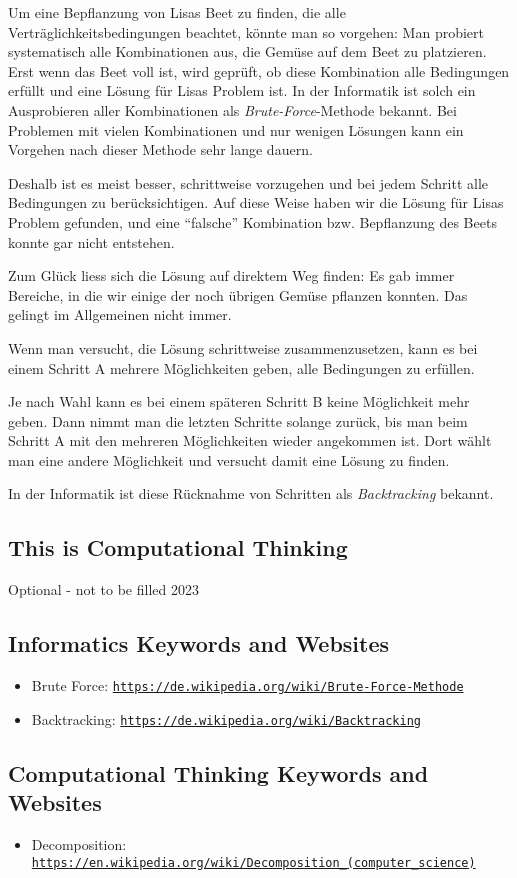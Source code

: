 \documentclass[a4paper,11pt]{report}
\newcommand{\BrochureUrlText}[1]{\texttt{#1}}
\newcommand{\taskGraphicsFolder}{..}
\begin{document}
Um eine Bepflanzung von Lisas Beet zu finden, die alle Verträglichkeitsbedingungen beachtet, könnte man so vorgehen: Man probiert systematisch alle Kombinationen aus, die Gemüse auf dem Beet zu platzieren. Erst wenn das Beet voll ist, wird geprüft, ob diese Kombination alle Bedingungen erfüllt und eine Lösung für Lisas Problem ist. In der Informatik ist solch ein Ausprobieren aller Kombinationen als \emph{Brute-Force}-Methode bekannt. Bei Problemen mit vielen Kombinationen und nur wenigen Lösungen kann ein Vorgehen nach dieser Methode sehr lange dauern.

Deshalb ist es meist besser, schrittweise vorzugehen und bei jedem Schritt alle Bedingungen zu berücksichtigen. Auf diese Weise haben wir die Lösung für Lisas Problem gefunden, und eine \enquote{falsche} Kombination bzw. Bepflanzung des Beets konnte gar nicht entstehen.

Zum Glück liess sich die Lösung auf direktem Weg finden: Es gab immer Bereiche, in die wir einige der noch übrigen Gemüse pflanzen konnten. Das gelingt im Allgemeinen nicht immer.

Wenn man versucht, die Lösung schrittweise zusammenzusetzen, kann es bei einem Schritt A mehrere Möglichkeiten geben, alle Bedingungen zu erfüllen.

{\centering%
\par}

Je nach Wahl kann es bei einem späteren Schritt B keine Möglichkeit mehr geben. Dann nimmt man die letzten Schritte solange zurück, bis man beim Schritt A mit den mehreren Möglichkeiten wieder angekommen ist. Dort wählt man eine andere Möglichkeit und versucht damit eine Lösung zu finden.

In der Informatik ist diese Rücknahme von Schritten als \emph{Backtracking} bekannt.


\subsection*{This is Computational Thinking}

Optional - not to be filled 2023


\subsection*{Informatics Keywords and Websites}

\begin{itemize}
  \item Brute Force: \href{https://de.wikipedia.org/wiki/Brute-Force-Methode}{\BrochureUrlText{https://de.wikipedia.org/wiki/Brute-Force-Methode}}
  \item Backtracking: \href{https://de.wikipedia.org/wiki/Backtracking}{\BrochureUrlText{https://de.wikipedia.org/wiki/Backtracking}}
\end{itemize}


\subsection*{Computational Thinking Keywords and Websites}

\begin{itemize}
  \item Decomposition: \href{https://en.wikipedia.org/wiki/Decomposition_(computer_science)}{\BrochureUrlText{https://en.wikipedia.org/wiki/Decomposition\_(computer\_science)}}
\end{itemize}
\end{document}
